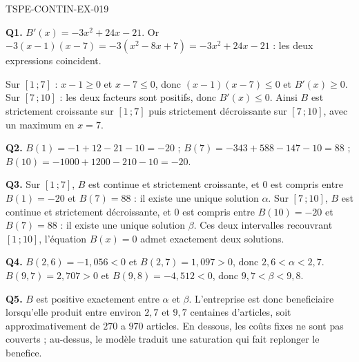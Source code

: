 \begin{corrige}{TSPE-CONTIN-EX-019}

\textbf{Q1.} $B'(x) = -3x^2 + 24x - 21$. Or $-3(x-1)(x-7) = -3(x^2 - 8x + 7) = -3x^2 + 24x - 21$ : les deux expressions coincident.

Sur $[1\,;7]$ : $x-1 \geq 0$ et $x-7 \leq 0$, donc $(x-1)(x-7) \leq 0$ et $B'(x) \geq 0$. Sur $[7\,;10]$ : les deux facteurs sont positifs, donc $B'(x) \leq 0$. Ainsi $B$ est strictement croissante sur $[1\,;7]$ puis strictement décroissante sur $[7\,;10]$, avec un maximum en $x = 7$.

\textbf{Q2.} $B(1) = -1 + 12 - 21 - 10 = -20$ ; $B(7) = -343 + 588 - 147 - 10 = 88$ ; $B(10) = -1000 + 1200 - 210 - 10 = -20$.

\textbf{Q3.} Sur $[1\,;7]$, $B$ est continue et strictement croissante, et $0$ est compris entre $B(1) = -20$ et $B(7) = 88$ : il existe une unique solution $\alpha$. Sur $[7\,;10]$, $B$ est continue et strictement décroissante, et $0$ est compris entre $B(10) = -20$ et $B(7) = 88$ : il existe une unique solution $\beta$. Ces deux intervalles recouvrant $[1\,;10]$, l'équation $B(x) = 0$ admet exactement deux solutions.

\textbf{Q4.} $B(2{,}6) = -1{,}056 < 0$ et $B(2{,}7) = 1{,}097 > 0$, donc $2{,}6 < \alpha < 2{,}7$. $B(9{,}7) = 2{,}707 > 0$ et $B(9{,}8) = -4{,}512 < 0$, donc $9{,}7 < \beta < 9{,}8$.

\textbf{Q5.} $B$ est positive exactement entre $\alpha$ et $\beta$. L'entreprise est donc beneficiaire lorsqu'elle produit entre environ $2{,}7$ et $9{,}7$ centaines d'articles, soit approximativement de $270$ a $970$ articles. En dessous, les coûts fixes ne sont pas couverts ; au-dessus, le modèle traduit une saturation qui fait replonger le benefice.
\end{corrige}
